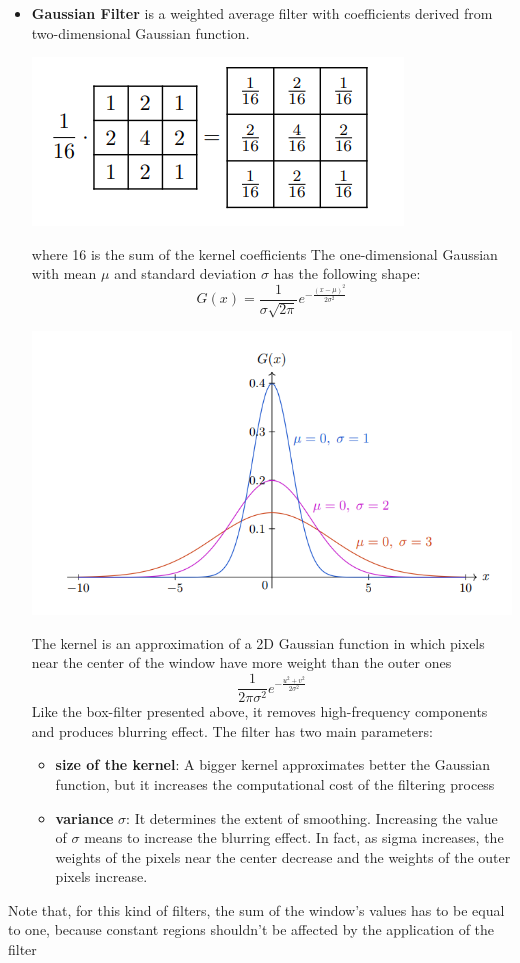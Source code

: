 \begin{itemize}
    \item \textbf{Gaussian Filter} is a weighted average filter with coefficients derived from two-dimensional Gaussian function.
    \begin{center}
        \includegraphics[]{images/gaussian filter.png}
    \end{center}
    where 16 is the sum of the kernel coefficients\newline
    The one-dimensional Gaussian with mean $\mu$ and standard deviation $\sigma$ has the following shape:
    \[G(x) = \frac{1}{\sigma \sqrt{2\pi}}e^{-\frac{(x-\mu)^{2}}{2\sigma^{2}}}\]
    \begin{center}
        \includegraphics[]{images/Gaussian.png}
    \end{center}
    The kernel is an approximation of a 2D Gaussian function in which pixels near the center of the window have more weight than the outer ones
    \[\frac{1}{2\pi \sigma^{2}}e^{-\frac{u^{2} + v^{2}}{2\sigma^{2}}}\]
    Like the box-filter presented above, it removes high-frequency components and produces blurring effect.\newline\newline
    The filter has two main parameters:
    \begin{itemize}
        \item \textbf{size of the kernel}: A bigger kernel approximates better the Gaussian function, but it increases the computational cost of the filtering process
        \item \textbf{variance} $\sigma$: It determines the extent of smoothing. Increasing the value of $\sigma$ means to increase the blurring effect. In fact, as sigma increases, the weights of the pixels near the center decrease and the weights of the outer pixels increase.
    \end{itemize}
\end{itemize}
Note that, for this kind of filters, the sum of the window's values has to be equal to one, because constant regions shouldn't be affected by the application of the filter
